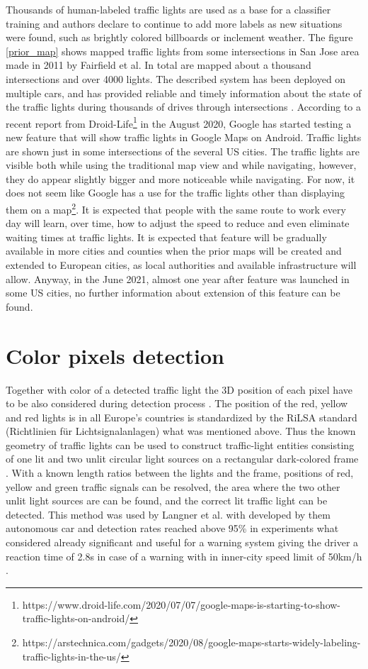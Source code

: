 \documentclass[letterpaper, 10 pt, conference]{ieeeconf} %
\begin{document}
Thousands of human-labeled traffic lights are used as a base for a classifier training and authors declare to continue to add more labels as new situations were found, such as brightly colored billboards or inclement weather. The figure \ref{prior_map} shows mapped traffic lights from some intersections in San Jose area made in 2011 by Fairfield et al. In total are mapped about a thousand intersections and over 4000 lights. The described system has been deployed on multiple cars, and has provided reliable and timely information about the state of the traffic lights during thousands of drives through intersections \cite{c5}. According to a recent report from Droid-Life\footnote{https://www.droid-life.com/2020/07/07/google-maps-is-starting-to-show-traffic-lights-on-android/} in the August 2020, Google has started testing a new feature that will show traffic lights in Google Maps on Android. Traffic lights are shown just in some intersections of the several US cities. The traffic lights are visible both while using the traditional map view and while navigating, however, they do appear slightly bigger and more noticeable while navigating. For now, it does not seem like Google has a use for the traffic lights other than displaying them on a map\footnote{https://arstechnica.com/gadgets/2020/08/google-maps-starts-widely-labeling-traffic-lights-in-the-us/}. It is expected that people with the same route to work every day will learn, over time, how to adjust the speed to reduce and even eliminate waiting times at traffic lights. It is expected that feature will be gradually available in more cities and counties when the prior maps will be created and extended to European cities, as local authorities and available infrastructure will allow. Anyway, in the June 2021, almost one year after feature was launched in some US cities, no further information about extension of this feature can be found. 
 
 
\section{Color pixels detection}
Together with color of a detected traffic light the 3D position of each pixel have to be also considered during detection process \cite{c4}. The position of the red, yellow and red lights is in all Europe's countries is standardized by the RiLSA standard (Richtlinien f\"ur Lichtsignalanlagen) what was mentioned above. Thus the known geometry of traffic lights can be used to construct traffic-light entities consisting of one lit and two unlit circular light sources on a rectangular dark-colored frame \cite{c4}.
With a known length ratios between the lights and the frame, positions of red, yellow and green traffic signals can be resolved, the area where the two other unlit light sources are can be found, and the correct lit traffic light can be detected. This method was used by Langner et al. with developed by them autonomous car and detection rates reached above 95\% in experiments what considered already significant and useful for a warning system giving the driver a reaction time of 2.8s in case of a warning with in inner-city speed limit of 50km/h \cite{c4}.
\end{document}
